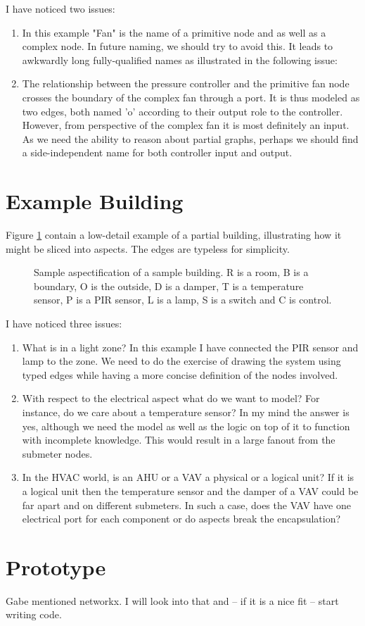 \documentclass{article}
\newcommand{\includeSVG}[1]{
  \texttt{[image: ./figs/\#1.pdf]}
}
\begin{document}
I have noticed two issues:
\begin{enumerate}
  \item In this example "Fan" is the name of a primitive node and as well as a complex node. In future naming, we should try to avoid this. It leads to awkwardly long fully-qualified names as illustrated in the following issue:
  \item The relationship between the pressure controller and the primitive fan node crosses the boundary of the complex fan through a port. It is thus modeled as two edges, both named 'o' according to their output role to the controller. However, from perspective of the complex fan it is most definitely an input. As we need the ability to reason about partial graphs, perhaps we should find a side-independent name for both controller input and output.
\end{enumerate}

\section{Example Building}

Figure \ref{fig:aspects} contain a low-detail example of a partial building, illustrating how it might be sliced into aspects. The edges are typeless for simplicity.

\begin{figure}[tb]
  \begin{center}
    \scalebox{0.7}{\includeSVG{aspects-graph-example}}
  \end{center}
  \caption{Sample aspectification of a sample building. R is a room, B is a boundary, O is the outside, D is a damper, T is a temperature sensor, P is a PIR sensor, L is a lamp, S is a switch and C is control.}
  \label{fig:aspects}
\end{figure}

I have noticed three issues:
\begin{enumerate}
  \item What is in a light zone? In this example I have connected the PIR sensor and lamp to the zone. We need to do the exercise of drawing the system using typed edges while having a more concise definition of the nodes involved.
  \item With respect to the electrical aspect what do we want to model? For instance, do we care about a temperature sensor? In my mind the answer is yes, although we need the model as well as the logic on top of it to function with incomplete knowledge. This would result in a large fanout from the submeter nodes.
  \item In the HVAC world, is an AHU or a VAV a physical or a logical unit? If it is a logical unit then the temperature sensor and the damper of a VAV could be far apart and on different submeters. In such a case, does the VAV have one electrical port for each component or do aspects break the encapsulation?
\end{enumerate}

\section{Prototype}

Gabe mentioned networkx. I will look into that and -- if it is a nice fit -- start writing code.

{}

\end{document}
